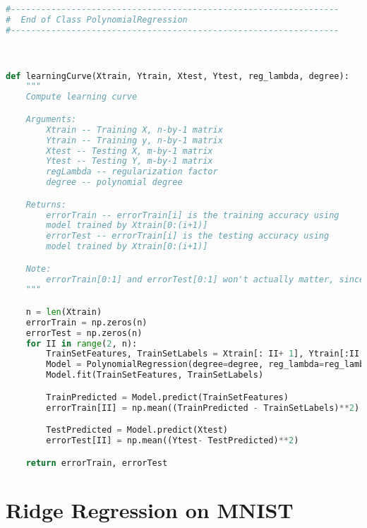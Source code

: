 \documentclass[]{article}
\begin{document}
\begin{lstlisting}[language=python]
#-----------------------------------------------------------------
#  End of Class PolynomialRegression
#-----------------------------------------------------------------



def learningCurve(Xtrain, Ytrain, Xtest, Ytest, reg_lambda, degree):
    """
    Compute learning curve

    Arguments:
        Xtrain -- Training X, n-by-1 matrix
        Ytrain -- Training y, n-by-1 matrix
        Xtest -- Testing X, m-by-1 matrix
        Ytest -- Testing Y, m-by-1 matrix
        regLambda -- regularization factor
        degree -- polynomial degree

    Returns:
        errorTrain -- errorTrain[i] is the training accuracy using
        model trained by Xtrain[0:(i+1)]
        errorTest -- errorTrain[i] is the testing accuracy using
        model trained by Xtrain[0:(i+1)]

    Note:
        errorTrain[0:1] and errorTest[0:1] won't actually matter, since we start displaying the learning curve at n = 2 (or higher)
    """

    n = len(Xtrain)
    errorTrain = np.zeros(n)
    errorTest = np.zeros(n)
    for II in range(2, n):
        TrainSetFeatures, TrainSetLabels = Xtrain[: II+ 1], Ytrain[:II + 1]
        Model = PolynomialRegression(degree=degree, reg_lambda=reg_lambda)
        Model.fit(TrainSetFeatures, TrainSetLabels)

        TrainPredicted = Model.predict(TrainSetFeatures)
        errorTrain[II] = np.mean((TrainPredicted - TrainSetLabels)**2)

        TestPredicted = Model.predict(Xtest)
        errorTest[II] = np.mean((Ytest- TestPredicted)**2)

    return errorTrain, errorTest

        \end{lstlisting}

\section*{Ridge Regression on MNIST}
\end{document}
